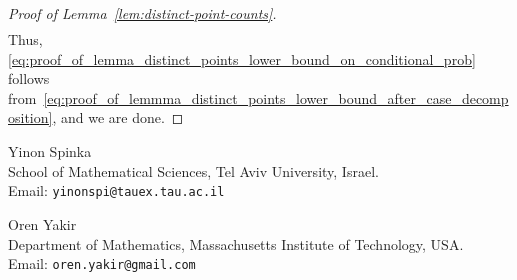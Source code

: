 \documentclass[11pt, reqno]{article}
\numberwithin{equation}{section}
\theoremstyle{definition}
\newcommand{\1}{\mathds{1}}
\begin{document}
\begin{proof}[Proof of Lemma~\ref{lem:distinct-point-counts}]
\begin{align*}
    \end{align*}
    Thus, \eqref{eq:proof_of_lemma_distinct_points_lower_bound_on_conditional_prob} follows from~\eqref{eq:proof_of_lemmma_distinct_points_lower_bound_after_case_decomposition}, and we are done. 
\end{proof}






\bigskip 
\bigskip

\noindent 
Yinon Spinka \\ School of Mathematical Sciences, Tel Aviv University, Israel. \\ Email: {\tt yinonspi@tauex.tau.ac.il} 

\bigskip
\bigskip

\noindent 
Oren Yakir \\ Department of Mathematics, Massachusetts Institute of Technology, USA. \\ Email: {\tt oren.yakir@gmail.com}
\end{document}
